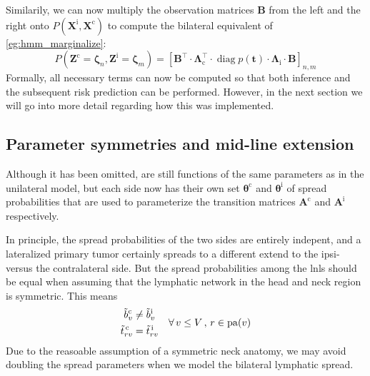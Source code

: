 \documentclass[\relativeRoot/main.tex]{subfiles}
\begin{document}
Similarily, we can now multiply the observation matrices $\mathbf{B}$ from the left and the right onto $P \left( \mathbf{X}^\text{i}, \mathbf{X}^\text{c} \right)$ to compute the bilateral equivalent of \cref{eg:hmm_marginalize}:
%
\begin{equation} \label{eq:hmm_bilateral_observation}
    P \left( \mathbf{Z}^\text{c} = \boldsymbol{\zeta}_n, \mathbf{Z}^\text{i} = \boldsymbol{\zeta}_m \right) = \left[ \mathbf{B}^\top \cdot \boldsymbol{\Lambda}_\text{c}^\top \cdot \operatorname{diag}{p(\mathbf{t})} \cdot \boldsymbol{\Lambda}_\text{i} \cdot \mathbf{B} \right]_{n,m}
\end{equation}
%
Formally, all necessary terms can now be computed so that both inference and the subsequent risk prediction can be performed. However, in the next section we will go into more detail regarding how this was implemented.

\subsection{Parameter symmetries and mid-line extension}
\label{subsec:hmm:bilateral:parameter_symmetries}

Although it has been omitted,  are still functions of the same parameters as in the unilateral model, but each side now has their own set $\boldsymbol{\theta}^\text{c}$ and $\boldsymbol{\theta}^\text{i}$ of spread probabilities that are used to parameterize the transition matrices $\mathbf{A}^\text{c}$ and $\mathbf{A}^\text{i}$ respectively.

In principle, the spread probabilities of the two sides are entirely indepent, and a lateralized primary tumor certainly spreads to a different extend to the ipsi- versus the contralateral side. But the spread probabilities among the \glspl{lnl} should be equal when assuming that the lymphatic network in the head and neck region is symmetric. This means
%
\begin{equation}
    \begin{aligned}
        \Tilde{b}^\text{c}_v &\neq \Tilde{b}^\text{i}_v \\
        \Tilde{t}^\text{\,c}_{rv} &= \Tilde{t}^\text{\,i}_{rv}
    \end{aligned}
    \quad \forall \, v \leq V \, , \, r \in \operatorname{pa}(v)
\end{equation}
%
Due to the reasoable assumption of a symmetric neck anatomy, we may avoid doubling the spread parameters when we model the bilateral lymphatic spread.
\end{document}
